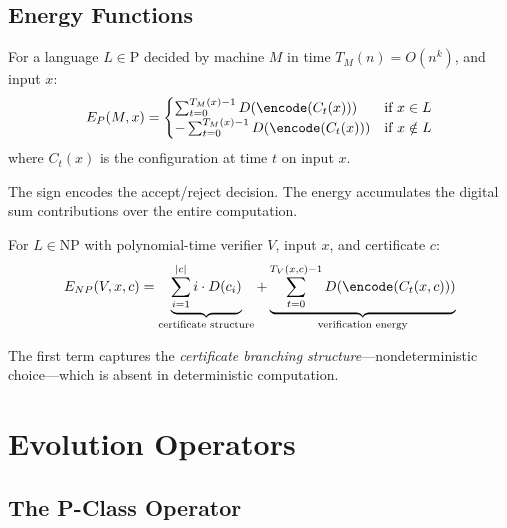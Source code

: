\subsection{Energy Functions}

\begin{definition}\label{def:p-energy}
For a language $L \in \text{P}$ decided by machine $M$ in time $T_M(n) = O(n^k)$, and input $x$:
\begin{equation}
E_P(M, x) = \begin{cases}
\sum_{t=0}^{T_M(x)-1} D(\encode(C_t(x))) & \text{if } x \in L \\
-\sum_{t=0}^{T_M(x)-1} D(\encode(C_t(x))) & \text{if } x \notin L
\end{cases}
\end{equation}
where $C_t(x)$ is the configuration at time $t$ on input $x$.
\end{definition}

The sign encodes the accept/reject decision. The energy accumulates the digital sum contributions over the entire computation.

\begin{definition}\label{def:np-energy}
For $L \in \text{NP}$ with polynomial-time verifier $V$, input $x$, and certificate $c$:
\begin{equation}
E_{NP}(V, x, c) = \underbrace{\sum_{i=1}^{|c|} i \cdot D(c_i)}_{\text{certificate structure}} + \underbrace{\sum_{t=0}^{T_V(x,c)-1} D(\encode(C_t(x,c)))}_{\text{verification energy}}
\end{equation}
\end{definition}

The first term captures the \textit{certificate branching structure}—nondeterministic choice—which is absent in deterministic computation.

\section{Evolution Operators}

\subsection{The P-Class Operator}

